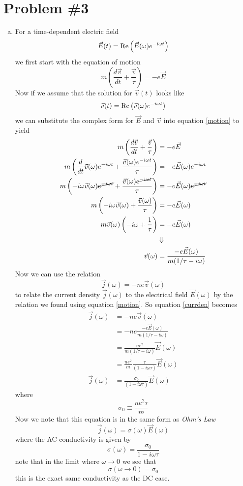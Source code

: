 \documentclass[11pt]{article}
\numberwithin{equation}{section}
\begin{document}
\section{Problem \#3}
\begin{enumerate}[(a)]
\item
For a time-dependent electric field
$$\vec{E}(t) = \textnormal{Re}\left(\vec{E}(\omega)e^{-i\omega t}\right)$$
we first start with the equation of motion
\begin{equation}
m\left(\frac{d\vec{v}}{dt} + \frac{\vec{v}}{\tau}\right) = -e\vec{E}
\label{motion}
\end{equation}
Now if we assume that the solution for $\vec{v}(t)$ looks like
$$\vec{v}(t) = \textnormal{Re}\left(\vec{v}(\omega)e^{-i\omega t}\right)$$
we can substitute the complex form for $\vec{E}$ and $\vec{v}$ into equation \ref{motion} to yield
\begin{align*}
m\left(\frac{d\vec{v}}{dt} + \frac{\vec{v}}{\tau}\right) &= -e\vec{E}\\
m\left(\frac{d}{dt}\vec{v}(\omega)e^{-i\omega t} + \frac{\vec{v}(\omega)e^{-i\omega t}}{\tau}\right) &= -e\vec{E}(\omega)e^{-i\omega t}\\
m\left(-i\omega\vec{v}(\omega)\cancel{e^{-i\omega t}} + \frac{\vec{v}(\omega)\cancel{e^{-i\omega t}}}{\tau}\right) &= -e\vec{E}(\omega)\cancel{e^{-i\omega t}}\\
m\left(-i\omega\vec{v}(\omega) + \frac{\vec{v}(\omega)}{\tau}\right) &= -e\vec{E}(\omega)\\
m\vec{v}(\omega)\left(-i\omega + \frac{1}{\tau}\right) &= -e\vec{E}(\omega)\\
&\Downarrow\\
\vec{v}(\omega) &= \frac{-e\vec{E}(\omega)}{m(1/\tau-i\omega)}
\end{align*}
Now we can use the relation
\begin{equation}
\vec{j}(\omega) = -ne\vec{v}(\omega)
\label{currden}
\end{equation}
to relate the current density $\vec{j}(\omega)$ to the electrical field $\vec{E}(\omega)$ by the relation we found using equation \ref{motion}. So equation \ref{currden} becomes
\begin{align*}
\vec{j}(\omega) &= -ne\vec{v}(\omega)\\
&= -ne\frac{-e\vec{E}(\omega)}{m(1/\tau-i\omega)}\\
&= \frac{ne^2}{m(1/\tau-i\omega)}\vec{E}(\omega)\\
&= \frac{ne^2}{m}\frac{\tau}{(1-i\omega\tau)}\vec{E}(\omega)\\
\vec{j}(\omega) &= \frac{\sigma_0}{(1-i\omega\tau)}\vec{E}(\omega)
\end{align*}
where 
$$\sigma_0 \equiv \frac{ne^2\tau}{m}$$
Now we note that this equation is in the same form as \emph{Ohm's Law}
$$\vec{j}(\omega) = \sigma(\omega)\vec{E}(\omega)$$
where the AC conductivity is given by
$$\sigma(\omega) = \frac{\sigma_0}{1-i\omega\tau}$$
note that in the limit where $\omega\rightarrow 0$ we see that
$$\sigma(\omega\rightarrow 0) = \sigma_0$$
this is the exact same conductivity as the DC case.


\end{enumerate}
\end{document}
